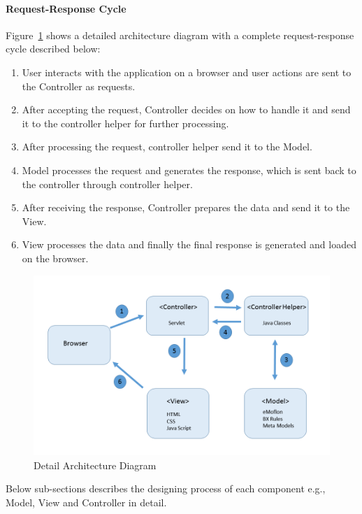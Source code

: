 \paragraph{Request-Response Cycle} 
Figure~\ref{fig:Detail_Architecture_Diagram} shows a detailed architecture diagram with a complete request-response cycle described below:
\begin{enumerate}
	\item {User interacts with the application on a browser and user actions are sent to the Controller as requests.}
	\item {After accepting the request, Controller decides on how to handle it and send it to the controller helper for further processing.}
	\item {After processing the request, controller helper send it to the Model.}
	\item {Model processes the request and generates the response, which is sent back to the controller through controller helper.}
	\item {After receiving the response, Controller prepares the data and send it to the View.}
	\item {View processes the data and finally the final response is generated and loaded on the browser.}
\end{enumerate}

\begin{figure}
	\includegraphics[width=1\textwidth]{figures/Detail_Arch}
	\caption{Detail Architecture Diagram}
	\label{fig:Detail_Architecture_Diagram}
\end{figure}

Below sub-sections describes the designing process of each component e.g., Model, View and Controller in detail.
